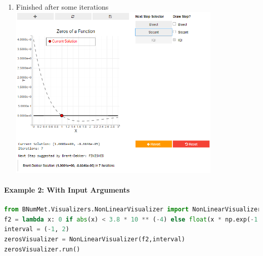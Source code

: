 \begin{enumerate}
    \item Finished after some iterations\\
    \includegraphics[width=0.8\textwidth]{Include/Images/Thesis/Documentation/Visualizers/NonLinear/Example 1/Example 1 - 04 - Finished.png}
   
\end{enumerate}



\paragraph{Example 2: With Input Arguments}
\begin{lstlisting}[language=Python]
from BNumMet.Visualizers.NonLinearVisualizer import NonLinearVisualizer
f2 = lambda x: 0 if abs(x) < 3.8 * 10 ** (-4) else float(x * np.exp(-1 / x**2))
interval = (-1, 2)
zerosVisualizer = NonLinearVisualizer(f2,interval)
zerosVisualizer.run()
\end{lstlisting}

